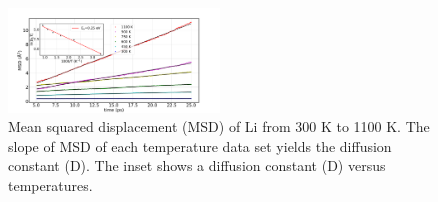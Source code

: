 \documentclass[twoside,twocolumn,9pt]{article}
\begin{document}
\begin{figure}
\centering
\includegraphics[width=0.5\textwidth]{Pics/MSD.pdf}
\caption{Mean squared displacement (MSD) of Li from 300 K to 1100 K.
The slope of MSD of each temperature data set yields the diffusion constant (D).
The inset shows a diffusion constant (D) versus temperatures.}
\label{fig:msd}
\end{figure}




\end{document}
